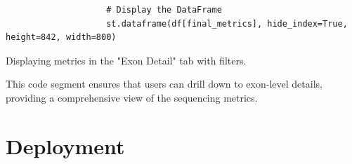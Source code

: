 \begin{longlisting}
\begin{verbatim}
                    # Display the DataFrame
                    st.dataframe(df[final_metrics], hide_index=True, height=842, width=800)
\end{verbatim}
\caption{Displaying metrics in the "Exon Detail" tab with filters.}
\label{code:results-exon-detail-tab}
\end{longlisting}

This code segment ensures that users can drill down to exon-level details, providing a comprehensive view of the sequencing metrics.

\section{Deployment}

